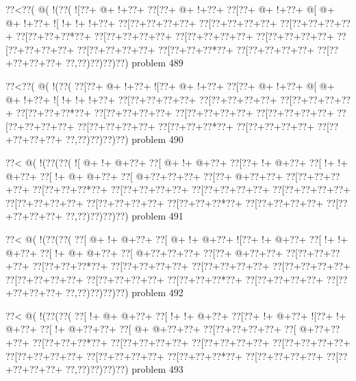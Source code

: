 \vbox{\vbox{\goo
\0??<\0??(\- @(\- !(\0??(
\- ![\0??+\- @+\- !+\0??+
\0??[\0??+\- @+\- !+\0??+
\0??[\0??+\- @+\- !+\0??+
\- @[\- @+\- @+\- !+\0??+
\- ![\- !+\- !+\- !+\0??+
\0??[\0??+\0??+\0??+\0??+
\0??[\0??+\0??+\0??+\0??+
\0??[\0??+\0??+\0??+\0??+
\0??[\0??+\0??+\0??*\0??+
\0??[\0??+\0??+\0??+\0??+
\0??[\0??+\0??+\0??+\0??+
\0??[\0??+\0??+\0??+\0??+
\0??[\0??+\0??+\0??+\0??+
\0??[\0??+\0??+\0??+\0??+
\0??[\0??+\0??+\0??*\0??+
\0??[\0??+\0??+\0??+\0??+
\0??[\0??+\0??+\0??+\0??+
\0??,\0??)\0??)\0??)\0??)
}
\hfil problem 489\hfil\break
}

\vbox{\vbox{\goo
\0??<\0??(\- @(\- !(\0??(
\0??[\0??+\- @+\- !+\0??+
\- ![\0??+\- @+\- !+\0??+
\0??[\0??+\- @+\- !+\0??+
\- @[\- @+\- @+\- !+\0??+
\- ![\- !+\- !+\- !+\0??+
\0??[\0??+\0??+\0??+\0??+
\0??[\0??+\0??+\0??+\0??+
\0??[\0??+\0??+\0??+\0??+
\0??[\0??+\0??+\0??*\0??+
\0??[\0??+\0??+\0??+\0??+
\0??[\0??+\0??+\0??+\0??+
\0??[\0??+\0??+\0??+\0??+
\0??[\0??+\0??+\0??+\0??+
\0??[\0??+\0??+\0??+\0??+
\0??[\0??+\0??+\0??*\0??+
\0??[\0??+\0??+\0??+\0??+
\0??[\0??+\0??+\0??+\0??+
\0??,\0??)\0??)\0??)\0??)
}
\hfil problem 490\hfil\break
}

\vbox{\vbox{\goo
\0??<\- @(\- !(\0??(\0??(
\- ![\- @+\- !+\- @+\0??+
\0??[\- @+\- !+\- @+\0??+
\0??[\0??+\- !+\- @+\0??+
\0??[\- !+\- !+\- @+\0??+
\0??[\- !+\- @+\- @+\0??+
\0??[\- @+\0??+\0??+\0??+
\0??[\0??+\- @+\0??+\0??+
\0??[\0??+\0??+\0??+\0??+
\0??[\0??+\0??+\0??*\0??+
\0??[\0??+\0??+\0??+\0??+
\0??[\0??+\0??+\0??+\0??+
\0??[\0??+\0??+\0??+\0??+
\0??[\0??+\0??+\0??+\0??+
\0??[\0??+\0??+\0??+\0??+
\0??[\0??+\0??+\0??*\0??+
\0??[\0??+\0??+\0??+\0??+
\0??[\0??+\0??+\0??+\0??+
\0??,\0??)\0??)\0??)\0??)
}
\hfil problem 491\hfil\break
}

\vbox{\vbox{\goo
\0??<\- @(\- !(\0??(\0??(
\0??[\- @+\- !+\- @+\0??+
\0??[\- @+\- !+\- @+\0??+
\- ![\0??+\- !+\- @+\0??+
\0??[\- !+\- !+\- @+\0??+
\0??[\- !+\- @+\- @+\0??+
\0??[\- @+\0??+\0??+\0??+
\0??[\0??+\- @+\0??+\0??+
\0??[\0??+\0??+\0??+\0??+
\0??[\0??+\0??+\0??*\0??+
\0??[\0??+\0??+\0??+\0??+
\0??[\0??+\0??+\0??+\0??+
\0??[\0??+\0??+\0??+\0??+
\0??[\0??+\0??+\0??+\0??+
\0??[\0??+\0??+\0??+\0??+
\0??[\0??+\0??+\0??*\0??+
\0??[\0??+\0??+\0??+\0??+
\0??[\0??+\0??+\0??+\0??+
\0??,\0??)\0??)\0??)\0??)
}
\hfil problem 492\hfil\break
}

\vbox{\vbox{\goo
\0??<\- @(\- !(\0??(\0??(
\0??[\- !+\- @+\- @+\0??+
\0??[\- !+\- !+\- @+\0??+
\0??[\0??+\- !+\- @+\0??+
\- ![\0??+\- !+\- @+\0??+
\0??[\- !+\- @+\0??+\0??+
\0??[\- @+\- @+\0??+\0??+
\0??[\0??+\0??+\0??+\0??+
\0??[\- @+\0??+\0??+\0??+
\0??[\0??+\0??+\0??*\0??+
\0??[\0??+\0??+\0??+\0??+
\0??[\0??+\0??+\0??+\0??+
\0??[\0??+\0??+\0??+\0??+
\0??[\0??+\0??+\0??+\0??+
\0??[\0??+\0??+\0??+\0??+
\0??[\0??+\0??+\0??*\0??+
\0??[\0??+\0??+\0??+\0??+
\0??[\0??+\0??+\0??+\0??+
\0??,\0??)\0??)\0??)\0??)
}
\hfil problem 493\hfil\break
}

